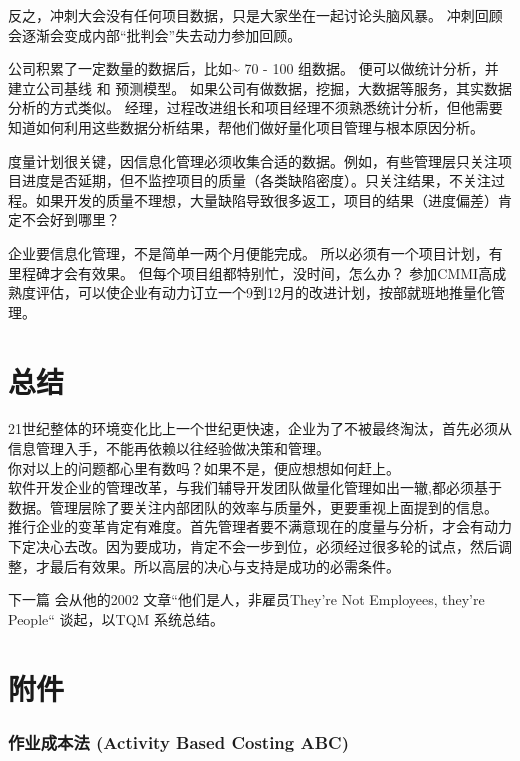 反之，冲刺大会没有任何项目数据，只是大家坐在一起讨论头脑风暴。
冲刺回顾会逐渐会变成内部``批判会''失去动力参加回顾。

公司积累了一定数量的数据后，比如\textasciitilde{} 70 - 100 组数据。
便可以做统计分析，并建立公司基线 和 预测模型。
如果公司有做数据，挖掘，大数据等服务，其实数据分析的方式类似。
经理，过程改进组长和项目经理不须熟悉统计分析，但他需要知道如何利用这些数据分析结果，帮他们做好量化项目管理与根本原因分析。

度量计划很关键，因信息化管理必须收集合适的数据。例如，有些管理层只关注项目进度是否延期，但不监控项目的质量（各类缺陷密度）。只关注结果，不关注过程。如果开发的质量不理想，大量缺陷导致很多返工，项目的结果（进度偏差）肯定不会好到哪里？

企业要信息化管理，不是简单一两个月便能完成。
所以必须有一个项目计划，有里程碑才会有效果。
但每个项目组都特别忙，没时间，怎么办？
参加CMMI高成熟度评估，可以使企业有动力订立一个9到12月的改进计划，按部就班地推量化管理。

\hypertarget{ux603bux7ed3}{%
\section{总结}\label{ux603bux7ed3}}

21世纪整体的环境变化比上一个世纪更快速，企业为了不被最终淘汰，首先必须从信息管理入手，不能再依赖以往经验做决策和管理。\\
你对以上的问题都心里有数吗？如果不是，便应想想如何赶上。\\
软件开发企业的管理改革，与我们辅导开发团队做量化管理如出一辙,都必须基于数据。管理层除了要关注内部团队的效率与质量外，更要重视上面提到的信息。\\
推行企业的变革肯定有难度。首先管理者要不满意现在的度量与分析，才会有动力下定决心去改。因为要成功，肯定不会一步到位，必须经过很多轮的试点，然后调整，才最后有效果。所以高层的决心与支持是成功的必需条件。

下一篇
会从他的2002 文章``他们是人，非雇员They're Not Employees, they're
People`` 谈起，以TQM 系统总结。



\hypertarget{ux9644ux4ef6}{%
\section{附件}\label{ux9644ux4ef6}}

\hypertarget{ux4f5cux4e1aux6210ux672cux6cd5-activity-based-costing-abc}{%
\subsubsection{作业成本法 (Activity Based Costing
ABC)}\label{ux4f5cux4e1aux6210ux672cux6cd5-activity-based-costing-abc}}

